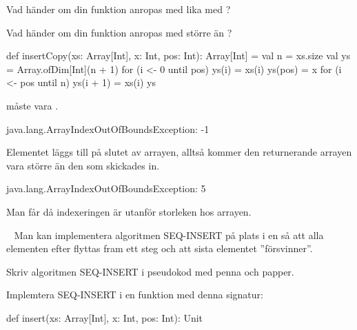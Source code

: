 {\Subtask Vad händer om din funktion anropas med  lika med ?

\Subtask Vad händer om din funktion anropas med  större än ?



\SOLUTION


\TaskSolved \what


\SubtaskSolved  \begin{Code}
def insertCopy(xs: Array[Int], x: Int, pos: Int): Array[Int] = {
  val n = xs.size
  val ys = Array.ofDim[Int](n + 1)
  for (i <- 0 until pos) ys(i) = xs(i)
  ys(pos) = x
  for (i <- pos until n) ys(i + 1) = xs(i)
  ys
}
\end{Code}

\SubtaskSolved  {} måste vara .

\SubtaskSolved  \begin{REPL}
java.lang.ArrayIndexOutOfBoundsException: -1
\end{REPL}

\SubtaskSolved  Elementet  läggs till på slutet av arrayen, alltså kommer den returnerande arrayen vara större än den som skickades in.

\SubtaskSolved  \begin{REPL}
java.lang.ArrayIndexOutOfBoundsException: 5
\end{REPL}
Man får  då indexeringen är utanför storleken hos arrayen.


\QUESTEND









\QUESTBEGIN

\Task  \what~  Man kan implementera algoritmen SEQ-INSERT på plats i en  så att alla elementen efter  flyttas fram ett steg och att sista elementet ''försvinner''.

\Subtask\Pen Skriv algoritmen SEQ-INSERT i pseudokod med penna och papper.

\Subtask Implemtera SEQ-INSERT i en funktion med denna signatur:
\begin{Code}
def insert(xs: Array[Int], x: Int, pos: Int): Unit
\end{Code}

\SOLUTION


\TaskSolved \what


}
